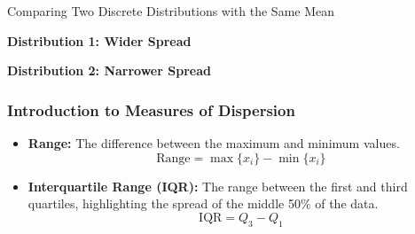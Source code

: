 \documentclass[handout]{beamer} %
\begin{document}
\begin{frame}{Comparing Two Discrete Distributions with the Same Mean}
\centering
\begin{minipage}{0.45\textwidth}
\centering
\textbf{Distribution 1: Wider Spread}\\
\end{minipage}
\hfill
\begin{minipage}{0.45\textwidth}
\centering
\textbf{Distribution 2: Narrower Spread}\\
\end{minipage}
\end{frame}


\begin{frame}
\frametitle{Introduction to Measures of Dispersion}
\begin{itemize}
    \item \textbf{Range:} The difference between the maximum and minimum values.
    \begin{equation*}
        \text{Range} = \max \{x_i\} - \min \{x_i \}
    \end{equation*}
    \item \textbf{Interquartile Range (IQR):} The range between the first and third quartiles, highlighting the spread of the middle 50\% of the data.
    \begin{equation*}
        \text{IQR} = Q_3 - Q_1
    \end{equation*}
\end{itemize}
\end{frame}
\end{document}
